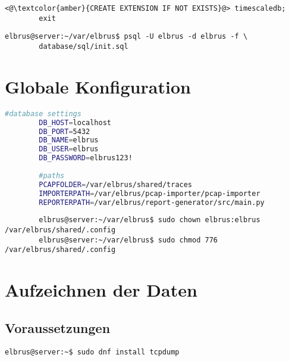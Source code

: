 \documentclass{article}
\begin{document}
	\begin{lstlisting}[caption={Hinzufügen der TimescaleDB Erweiterung.}, numbers=none]
		<@\textcolor{amber}{CREATE EXTENSION IF NOT EXISTS}@> timescaledb;
		exit
	\end{lstlisting}

	\lstset{style=commands}
	\begin{lstlisting}[caption={Anlegen der benötigten Tabellen duch das ausführen von 'init.sql'.}]
		elbrus@server:~/var/elbrus$ psql -U elbrus -d elbrus -f \
		database/sql/init.sql
	\end{lstlisting}
	
	\newpage
	
	\section{Globale Konfiguration}
	\lstset{style=files}
	\begin{lstlisting}[caption={Anhand von '.config.example' eigene '.config' Datei in \newline'/var/elbrus/shared' anlegen.}, language=bash]
		#database settings
		DB_HOST=localhost
		DB_PORT=5432
		DB_NAME=elbrus
		DB_USER=elbrus
		DB_PASSWORD=elbrus123!
		
		#paths
		PCAPFOLDER=/var/elbrus/shared/traces
		IMPORTERPATH=/var/elbrus/pcap-importer/pcap-importer
		REPORTERPATH=/var/elbrus/report-generator/src/main.py
	\end{lstlisting}

	\lstset{style=commands}
	\begin{lstlisting}
		elbrus@server:~/var/elbrus$ sudo chown elbrus:elbrus /var/elbrus/shared/.config
		elbrus@server:~/var/elbrus$ sudo chmod 776 /var/elbrus/shared/.config
	\end{lstlisting}
	\newpage
	
	\section{Aufzeichnen der Daten}
	\subsection{Voraussetzungen}
	\lstset{style=commands}
	\begin{lstlisting}[caption={Installieren von 'tcpdump' für das aufzeichnen von Daten.}]
		elbrus@server:~$ sudo dnf install tcpdump
	\end{lstlisting}
\end{document}
